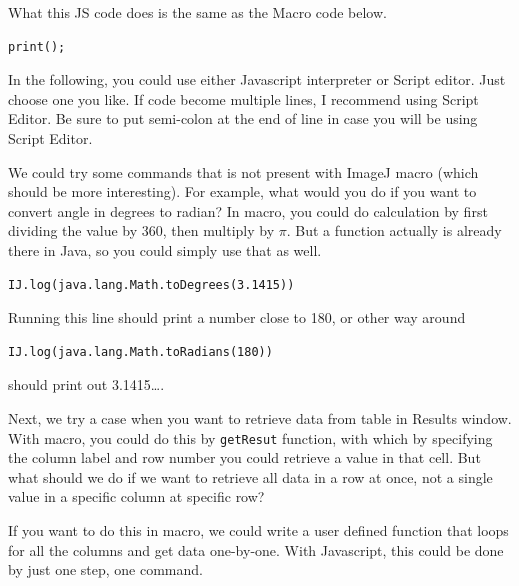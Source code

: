 \documentclass[11pt,a4paper,oneside]{report}
\newcommand{\ilcom}[1]{\texttt{\small#1}}
\begin{document}
What this JS code does is the same as the Macro code below. 
\begin{lstlisting}[numbers=none]
print();
\end{lstlisting}

In the following, you could use either Javascript interpreter 
or Script editor. Just choose one you like. If code become multiple lines, 
I recommend using Script Editor. Be sure to put semi-colon at the end of line 
in case you will be using Script Editor. 

We could try some commands that is not present with 
ImageJ macro (which should be more interesting). 
For example, what would you do if you want to convert angle in degrees to radian? 
In macro, you could do calculation by first dividing the value by 360, 
then multiply by $\pi$. But a function actually is already there in Java, 
so you could simply use that as well. 
\begin{lstlisting}[numbers=none]
IJ.log(java.lang.Math.toDegrees(3.1415)) 
\end{lstlisting}
Running this line should print a number close to 180, or other way around
\begin{lstlisting}[numbers=none]
IJ.log(java.lang.Math.toRadians(180)) 
\end{lstlisting}
should print out 3.1415\dots.

Next, we try a case when you want to retrieve data from table in Results window. 
With macro, you could do this by \ilcom{getResut} function, 
with which by specifying the column label and row number you could retrieve 
a value in that cell. But what should we do if we want to retrieve all data in a row at once, 
not a single value in a specific column at specific row? 

If you want to do this in macro, we could write a user defined function that loops 
for all the columns and get data one-by-one. 
With Javascript, this could be done by just one step, one command. 
\end{document}
